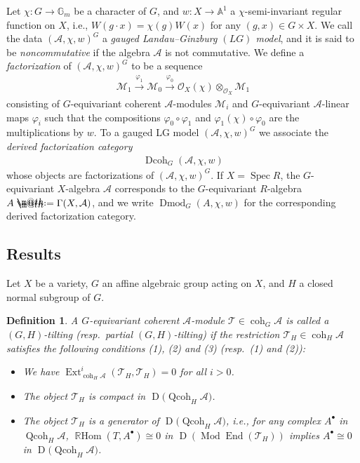 \documentclass[10pt,a4paper]{amsart}
\makeatletter
\newtheorem{dfn}{Definition}[section]
\newcommand*{\defeq}{\mathrel{\rlap{%
 \raisebox{0.3ex}{$\m@th\cdot$}}%
 \raisebox{-0.3ex}{$\m@th\cdot$}}%
 =}
\numberwithin{equation}{section}
\newcommand{\Dmod}{\operatorname{Dmod}}
\newcommand{\Dcoh}{\operatorname{Dcoh}}
\newcommand{\Spec}{\operatorname{Spec}}
\newcommand{\Ext}{\operatorname{Ext}}
\newcommand{\RHom}{\operatorname{{\mathbb R}Hom}}
\newcommand{\End}{\operatorname{End}}
\newcommand{\coh}{\operatorname{coh}}
\newcommand{\Qcoh}{\operatorname{Qcoh}}
\newcommand{\Mod}{\operatorname{Mod}}
\newcommand{\D}{\operatorname{D}}
\newcommand{\cA}{\mathcal{A}}
\newcommand{\cM}{\mathcal{M}}
\newcommand{\cO}{\mathcal{O}}
\newcommand{\cT}{\mathcal{T}}
\newcommand{\bA}{\mathbb{A}}
\newcommand{\bG}{\mathbb{G}}
\makeatother
\begin{document}
Let $\chi\colon G\to \bG_m$ be a character of $G$, and $w\colon X\to \bA^1$ a $\chi$-semi-invariant regular function on $X$, i.e., $W(g\cdot x)=\chi(g)W(x)$ for any $(g,x)\in G\times X$. We call the data $(\cA,\chi,w)^G$ a {\it gauged Landau--Ginzburg $(LG)$ model}, and it is said to be {\it noncommutative} if the algebra $\cA$ is not commutative. We define a {\it factorization} of $(\cA,\chi,w)^G$ to be a sequence
\begin{gather*}
\cM_1\xrightarrow{\varphi_1}\cM_0\xrightarrow{\varphi_0}\cO_X(\chi)\otimes_{\cO_X}\cM_1
\end{gather*}
consisting of $G$-equivariant coherent $\cA$-modules $\cM_i$ and $G$-equivariant $\cA$-linear maps $\varphi_i$ such that the compositions $\varphi_0\circ \varphi_1$ and $\varphi_1(\chi)\circ\varphi_0$ are the multiplications by $w$.
To a gauged LG model $(\cA,\chi,w)^G$ we associate the {\it derived factorization category}
\begin{gather*}
\Dcoh_G(\cA,\chi,w)
\end{gather*}
whose objects are factorizations of $(\cA,\chi,w)^G$. If $X=\Spec R$, the $G$-equivariant $X$-algebra $\cA$ corresponds to the $G$-equivariant $R$-algebra $A\defeq\Gamma(X,\cA)$, and we write $\Dmod_G(A,\chi,w)$ for the corresponding derived factorization category.

\subsection{Results}
 Let $X$ be a variety, $G$ an affine algebraic group acting on $X$, and $H$ a closed normal subgroup of $G$.
 \begin{dfn}
 A $G$-equivariant coherent $\cA$-module $\cT\in \coh_G\cA$ is called a {\it $(G,H)$-tilting} (resp.\ {\it partial $(G,H)$-tilting}) if the restriction $\cT_H\in \coh_H\cA$ satisfies the following conditions (1), (2) and (3) (resp.\ (1) and (2)):
 \begin{itemize}\itemsep=0pt
\item[$1.$] We have $\Ext_{\coh_H\cA}^i(\cT_H,\cT_H)=0$ for all $i>0$.

\item[$2.$] The object $\cT_H$ is {\it compact} in $\D\big(\Qcoh_H\cA\big)$.

\item[$3.$] The object $\cT_H$ is a {\it generator} of $\D\big(\Qcoh_H\cA\big)$, i.e., for any complex $A^{\bullet}$ in $\Qcoh_H\cA$, $\RHom(T,A^{\bullet})\cong0$ in $\D(\Mod\End(\cT_H))$ implies $A^{\bullet}\cong0$ in $\D\big(\Qcoh_H\cA\big)$.
\end{itemize}
 \end{dfn}
\end{document}
